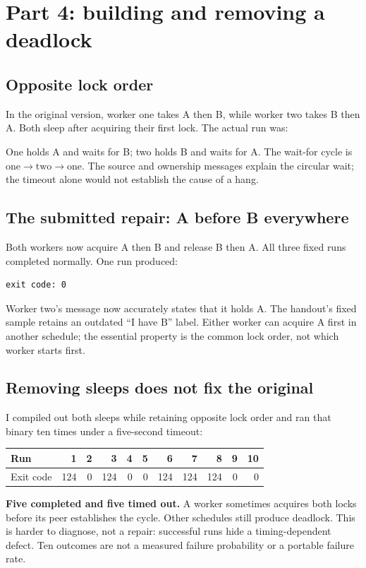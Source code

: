 \documentclass[12pt]{article}
\begin{document}
\clearpage
\section{Part 4: building and removing a deadlock}
\subsection{Opposite lock order}
In the original version, worker one takes A then B, while worker two takes
B then A. Both sleep after acquiring their first lock. The actual run was:

One holds A and waits for B; two holds B and waits for A. The wait-for
cycle is \(\text{one} \to \text{two} \to \text{one}\).
The source and ownership messages explain the circular wait; the timeout
alone would not establish the cause of a hang.

\subsection{The submitted repair: A before B everywhere}
Both workers now acquire A then B and release B then A. All three fixed
runs completed normally. One run produced:

\begin{lstlisting}
exit code: 0
\end{lstlisting}
Worker two's message now accurately states that it holds A. The handout's
fixed sample retains an outdated ``I have B'' label. Either worker can
acquire A first in another schedule; the essential property is the common
lock order, not which worker starts first.

\subsection{Removing sleeps does not fix the original}
I compiled out both sleeps while retaining opposite lock order and ran
that binary ten times under a five-second timeout:
\begin{center}
\begin{tabular}{lrrrrrrrrrr}
\toprule
Run & 1 & 2 & 3 & 4 & 5 & 6 & 7 & 8 & 9 & 10 \\
\midrule
Exit code & 124 & 0 & 124 & 0 & 0 & 124 & 124 & 124 & 0 & 0 \\
\bottomrule
\end{tabular}
\end{center}
\textbf{Five completed and five timed out.} A worker sometimes acquires both
locks before its peer establishes the cycle. Other schedules still
produce deadlock. This is harder to diagnose, not a repair: successful
runs hide a timing-dependent defect. Ten outcomes are not a measured
failure probability or a portable failure rate.
\end{document}
